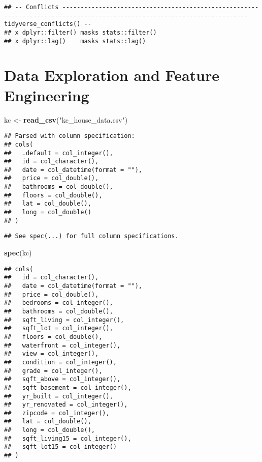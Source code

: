 \documentclass[]{article}
\newenvironment{Shaded}{\begin{snugshade}}{\end{snugshade}}
\newcommand{\KeywordTok}[1]{\textcolor[rgb]{0.13,0.29,0.53}{\textbf{#1}}}
\newcommand{\StringTok}[1]{\textcolor[rgb]{0.31,0.60,0.02}{#1}}
\newcommand{\NormalTok}[1]{#1}
\begin{document}
\begin{verbatim}
## -- Conflicts ------------------------------------------------------------------------------------------------------------------------- tidyverse_conflicts() --
## x dplyr::filter() masks stats::filter()
## x dplyr::lag()    masks stats::lag()
\end{verbatim}

\section{Data Exploration and Feature
Engineering}\label{data-exploration-and-feature-engineering}

\begin{Shaded}
\begin{Highlighting}[]
\NormalTok{kc <-}\StringTok{ }\KeywordTok{read_csv}\NormalTok{(}\StringTok{"kc_house_data.csv"}\NormalTok{)}
\end{Highlighting}
\end{Shaded}

\begin{verbatim}
## Parsed with column specification:
## cols(
##   .default = col_integer(),
##   id = col_character(),
##   date = col_datetime(format = ""),
##   price = col_double(),
##   bathrooms = col_double(),
##   floors = col_double(),
##   lat = col_double(),
##   long = col_double()
## )
\end{verbatim}

\begin{verbatim}
## See spec(...) for full column specifications.
\end{verbatim}

\begin{Shaded}
\begin{Highlighting}[]
\KeywordTok{spec}\NormalTok{(kc)}
\end{Highlighting}
\end{Shaded}

\begin{verbatim}
## cols(
##   id = col_character(),
##   date = col_datetime(format = ""),
##   price = col_double(),
##   bedrooms = col_integer(),
##   bathrooms = col_double(),
##   sqft_living = col_integer(),
##   sqft_lot = col_integer(),
##   floors = col_double(),
##   waterfront = col_integer(),
##   view = col_integer(),
##   condition = col_integer(),
##   grade = col_integer(),
##   sqft_above = col_integer(),
##   sqft_basement = col_integer(),
##   yr_built = col_integer(),
##   yr_renovated = col_integer(),
##   zipcode = col_integer(),
##   lat = col_double(),
##   long = col_double(),
##   sqft_living15 = col_integer(),
##   sqft_lot15 = col_integer()
## )
\end{verbatim}
\end{document}
